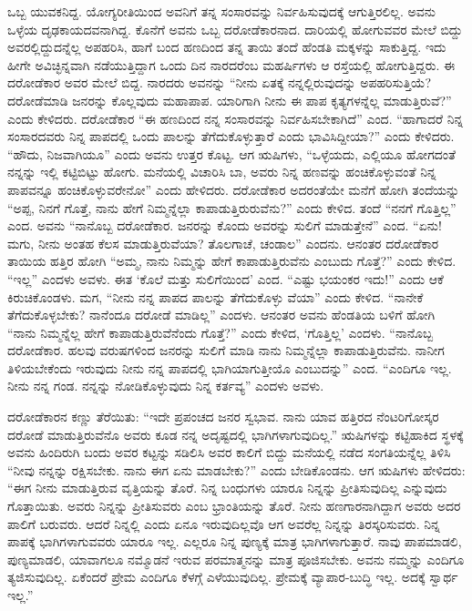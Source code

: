 ಒಬ್ಬ ಯುವಕನಿದ್ದ. ಯೋಗ್ಯರೀತಿಯಿಂದ ಅವನಿಗೆ ತನ್ನ ಸಂಸಾರವನ್ನು ನಿರ್ವಹಿಸುವುದಕ್ಕೆ ಆಗುತ್ತಿರಲಿಲ್ಲ. ಅವನು ಒಳ್ಳೆಯ ದೃಢಕಾಯದವನಾಗಿದ್ದ. ಕೊನೆಗೆ ಅವನು ಒಬ್ಬ ದರೋಡೆಕಾರನಾದ. ದಾರಿಯಲ್ಲಿ ಹೋಗುವವರ ಮೇಲೆ ಬಿದ್ದು ಅವರಲ್ಲಿದ್ದುದನ್ನೆಲ್ಲ ಅಪಹರಿಸಿ, ಹಾಗೆ ಬಂದ ಹಣದಿಂದ ತನ್ನ ತಾಯಿ ತಂದೆ ಹೆಂಡತಿ ಮಕ್ಕಳನ್ನು ಸಾಕುತ್ತಿದ್ದ. ಇದು ಹೀಗೇ ಅವಿಚ್ಛಿನ್ನವಾಗಿ ನಡೆಯುತ್ತಿದ್ದಾಗ ಒಂದು ದಿನ ನಾರದರೆಂಬ ಮಹರ್ಷಿಗಳು ಆ ರಸ್ತೆಯಲ್ಲಿ ಹೋಗುತ್ತಿದ್ದರು. ಈ ದರೋಡೆಕಾರ ಅವರ ಮೇಲೆ ಬಿದ್ದ. ನಾರದರು ಅವನನ್ನು “ನೀನು ಏತಕ್ಕೆ ನನ್ನಲ್ಲಿರುವುದನ್ನು ಅಪಹರಿಸುತ್ತಿಯೆ? ದರೋಡೆಮಾಡಿ ಜನರನ್ನು ಕೊಲ್ಲವುದು ಮಹಾಪಾಪ. ಯಾರಿಗಾಗಿ ನೀನು ಈ ಪಾಪ ಕೃತ್ಯಗಳನ್ನೆಲ್ಲ ಮಾಡುತ್ತಿರುವೆ?” ಎಂದು ಕೇಳಿದರು. ದರೋಡೆಕಾರ “ಈ ಹಣದಿಂದ ನನ್ನ ಸಂಸಾರವನ್ನು ನಿರ್ವಹಿಸಬೇಕಾಗಿದೆ” ಎಂದ. “ಹಾಗಾದರೆ ನಿನ್ನ ಸಂಸಾರದವರು ನಿನ್ನ ಪಾಪದಲ್ಲಿ ಒಂದು ಪಾಲನ್ನು ತೆಗೆದುಕೊಳ್ಳುತ್ತಾರೆ ಎಂದು ಭಾವಿಸಿದ್ದೀಯಾ?” ಎಂದು ಕೇಳಿದರು. “ಹೌದು, ನಿಜವಾಗಿಯೂ” ಎಂದು ಅವನು ಉತ್ತರ ಕೊಟ್ಟ. ಆಗ ಋಷಿಗಳು, “ಒಳ್ಳೆಯದು, ಎಲ್ಲಿಯೂ ಹೋಗದಂತೆ ನನ್ನನ್ನು ಇಲ್ಲಿ ಕಟ್ಟಿಬಿಟ್ಟು ಹೋಗು. ಮನೆಯಲ್ಲಿ ವಿಚಾರಿಸಿ ಬಾ, ಅವರು ನಿನ್ನ ಹಣವನ್ನು ಹಂಚಿಕೊಳ್ಳುವಂತೆ ನಿನ್ನ ಪಾಪವನ್ನೂ ಹಂಚಿಕೊಳ್ಳುವರೇನೋ” ಎಂದು ಹೇಳಿದರು. ದರೋಡೆಕಾರ ಅದರಂತೆಯೇ ಮನೆಗೆ ಹೋಗಿ ತಂದೆಯನ್ನು “ಅಪ್ಪ, ನಿನಗೆ ಗೊತ್ತೆ, ನಾನು ಹೇಗೆ ನಿಮ್ಮನ್ನೆಲ್ಲಾ ಕಾಪಾಡುತ್ತಿರುರುವೆನು?” ಎಂದು ಕೇಳಿದ. ತಂದೆ “ನನಗೆ ಗೊತ್ತಿಲ್ಲ” ಎಂದ. ಅವನು “ನಾನೊಬ್ಬ ದರೋಡೆಕಾರ. ಜನರನ್ನು ಕೊಂದು ಅವರನ್ನು ಸುಲಿಗೆ ಮಾಡುತ್ತೇನೆ” ಎಂದ. “ಏನು!ಮಗು, ನೀನು ಅಂತಹ ಕೆಲಸ ಮಾಡುತ್ತಿರುವೆಯಾ? ತೊಲಗಾಚೆ, ಚಂಡಾಲ” ಎಂದನು. ಆನಂತರ ದರೋಡೆಕಾರ ತಾಯಿಯ ಹತ್ತಿರ ಹೋಗಿ “ಅಮ್ಮ, ನಾನು ನಿಮ್ಮನ್ನು ಹೇಗೆ ಕಾಪಾಡುತ್ತಿರುವೆನು ಎಂಬುದು ಗೊತ್ತೆ?” ಎಂದು ಕೇಳಿದ. “ಇಲ್ಲ” ಎಂದಳು ಅವಳು. ಈತ ‘ಕೊಲೆ ಮತ್ತು ಸುಲಿಗೆಯಿಂದ’ ಎಂದ. “ಎಷ್ಟು ಭಯಂಕರ ಇದು!” ಎಂದು ಆಕೆ ಕಿರುಚಿಕೊಂಡಳು. ಮಗ, “ನೀನು ನನ್ನ ಪಾಪದ ಪಾಲನ್ನು ತೆಗೆದುಕೊಳ್ಳು ವೆಯಾ” ಎಂದು ಕೇಳಿದ. “ನಾನೇಕೆ ತೆಗೆದುಕೊಳ್ಳಬೇಕು? ನಾನೆಂದೂ ದರೋಡೆ ಮಾಡಿಲ್ಲ” ಎಂದಳು. ಆನಂತರ ಅವನು ಹೆಂಡತಿಯ ಬಳಿಗೆ ಹೋಗಿ “ನಾನು ನಿಮ್ಮನ್ನೆಲ್ಲ ಹೇಗೆ ಕಾಪಾಡುತ್ತಿರುವೆನೆಂದು ಗೊತ್ತೆ?” ಎಂದು ಕೇಳಿದ, ‘ಗೊತ್ತಿಲ್ಲ’ ಎಂದಳು. “ನಾನೊಬ್ಬ ದರೋಡೆಕಾರ. ಹಲವು ವರುಷಗಳಿಂದ ಜನರನ್ನು ಸುಲಿಗೆ ಮಾಡಿ ನಾನು ನಿಮ್ಮನ್ನೆಲ್ಲಾ ಕಾಪಾಡುತ್ತಿರುವೆನು. ನಾನೀಗ ತಿಳಿಯಬೇಕೆಂದು ಇರುವುದು ನೀನು ನನ್ನ ಪಾಪದಲ್ಲಿ ಭಾಗಿಯಾಗುತ್ತೀಯೊ ಎಂಬುದನ್ನು” ಎಂದ. “ಎಂದಿಗೂ ಇಲ್ಲ. ನೀನು ನನ್ನ ಗಂಡ. ನನ್ನನ್ನು ನೋಡಿಕೊಳ್ಳುವುದು ನಿನ್ನ ಕರ್ತವ್ಯ” ಎಂದಳು ಅವಳು.

ದರೋಡೆಕಾರನ ಕಣ್ಣು ತೆರೆಯಿತು: “ಇದೇ ಪ್ರಪಂಚದ ಜನರ ಸ್ವಭಾವ. ನಾನು ಯಾವ ಹತ್ತಿರದ ನೆಂಟರಿಗೋಸ್ಕರ ದರೋಡೆ ಮಾಡುತ್ತಿರುವೆನೊ ಅವರು ಕೂಡ ನನ್ನ ಅದೃಷ್ಟದಲ್ಲಿ ಭಾಗಿಗಳಾಗುವುದಿಲ್ಲ.” ಋಷಿಗಳನ್ನು ಕಟ್ಟಿಹಾಕಿದ ಸ್ಥಳಕ್ಕೆ ಅವನು ಹಿಂದಿರುಗಿ ಬಂದು ಅವರ ಕಟ್ಟನ್ನು ಸಡಿಲಿಸಿ ಅವರ ಕಾಲಿಗೆ ಬಿದ್ದು ಮನೆಯಲ್ಲಿ ನಡೆದ ಸಂಗತಿಯನ್ನೆಲ್ಲ ತಿಳಿಸಿ “ನೀವು ನನ್ನನ್ನು ರಕ್ಷಿಸಬೇಕು. ನಾನು ಈಗ ಏನು ಮಾಡಬೇಕು?” ಎಂದು ಬೇಡಿಕೊಂಡನು. ಆಗ ಋಷಿಗಳು ಹೇಳಿದರು: “ಈಗ ನೀನು ಮಾಡುತ್ತಿರುವ ವೃತ್ತಿಯನ್ನು ತೊರೆ. ನಿನ್ನ ಬಂಧುಗಳು ಯಾರೂ ನಿನ್ನನ್ನು ಪ್ರೀತಿಸುವುದಿಲ್ಲ ಎನ್ನುವುದು ಗೊತ್ತಾಯಿತು. ಅವರು ನಿನ್ನನ್ನು ಪ್ರೀತಿಸುವರು ಎಂಬ ಭ್ರಾಂತಿಯನ್ನು ತೊರೆ. ನೀನು ಹಣಗಾರನಾಗಿದ್ದಾಗ ಅವರು ಅದರ ಪಾಲಿಗೆ ಬರುವರು. ಆದರೆ ನಿನ್ನಲ್ಲಿ ಎಂದು ಏನೂ ಇರುವುದಿಲ್ಲವೊ ಆಗ ಅವರೆಲ್ಲ ನಿನ್ನನ್ನು ತಿರಸ್ಕರಿಸುವರು. ನಿನ್ನ ಪಾಪಕ್ಕೆ ಭಾಗಿಗಳಾಗುವವರು ಯಾರೂ ಇಲ್ಲ. ಎಲ್ಲರೂ ನಿನ್ನ ಪುಣ್ಯಕ್ಕೆ ಮಾತ್ರ ಭಾಗಿಗಳಾಗುತ್ತಾರೆ. ನಾವು ಪಾಪಮಾಡಲಿ, ಪುಣ್ಯಮಾಡಲಿ, ಯಾವಾಗಲೂ ನಮ್ಮೊಡನೆ ಇರುವ ಪರಮಾತ್ಮನನ್ನು ಮಾತ್ರ ಪೂಜಿಸಬೇಕು. ಅವನು ನಮ್ಮನ್ನು ಎಂದಿಗೂ ತ್ಯಜಿಸುವುದಿಲ್ಲ. ಏಕೆಂದರೆ ಪ್ರೇಮ ಎಂದಿಗೂ ಕೆಳಗ್ಗೆ ಎಳೆಯುವುದಿಲ್ಲ. ಪ್ರೇಮಕ್ಕೆ ವ್ಯಾಪಾರ-ಬುದ್ಧಿ ಇಲ್ಲ. ಅದಕ್ಕೆ ಸ್ವಾರ್ಥ ಇಲ್ಲ.”

